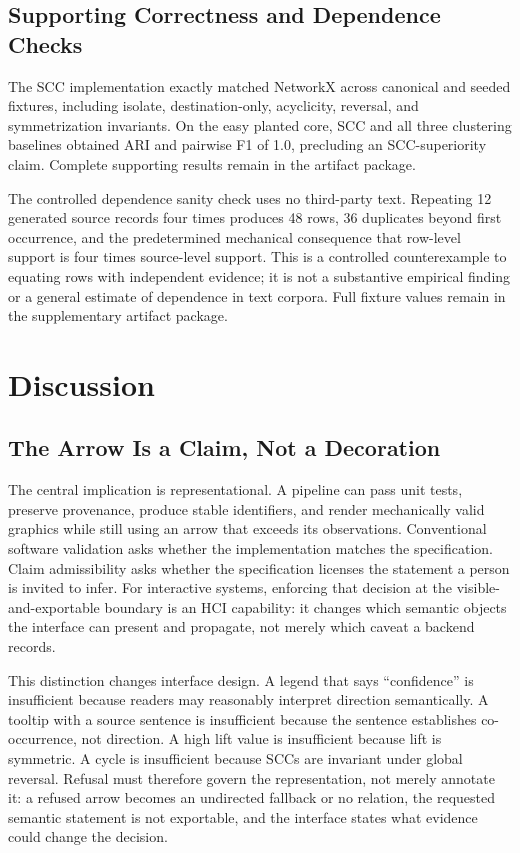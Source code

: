 \documentclass[manuscript,screen,review]{acmart}
\begin{document}
\subsection{Supporting Correctness and Dependence Checks}

The SCC implementation exactly matched NetworkX across canonical and seeded fixtures, including isolate, destination-only, acyclicity, reversal, and symmetrization invariants. On the easy planted core, SCC and all three clustering baselines obtained ARI and pairwise F1 of 1.0, precluding an SCC-superiority claim. Complete supporting results remain in the artifact package.

The controlled dependence sanity check uses no third-party text. Repeating 12 generated source records four times produces 48 rows, 36 duplicates beyond first occurrence, and the predetermined mechanical consequence that row-level support is four times source-level support. This is a controlled counterexample to equating rows with independent evidence; it is not a substantive empirical finding or a general estimate of dependence in text corpora. Full fixture values remain in the supplementary artifact package.

\section{Discussion}

\subsection{The Arrow Is a Claim, Not a Decoration}

The central implication is representational. A pipeline can pass unit tests, preserve provenance, produce stable identifiers, and render mechanically valid graphics while still using an arrow that exceeds its observations. Conventional software validation asks whether the implementation matches the specification. Claim admissibility asks whether the specification licenses the statement a person is invited to infer. For interactive systems, enforcing that decision at the visible-and-exportable boundary is an HCI capability: it changes which semantic objects the interface can present and propagate, not merely which caveat a backend records.

This distinction changes interface design. A legend that says ``confidence'' is insufficient because readers may reasonably interpret direction semantically. A tooltip with a source sentence is insufficient because the sentence establishes co-occurrence, not direction. A high lift value is insufficient because lift is symmetric. A cycle is insufficient because SCCs are invariant under global reversal. Refusal must therefore govern the representation, not merely annotate it: a refused arrow becomes an undirected fallback or no relation, the requested semantic statement is not exportable, and the interface states what evidence could change the decision.
\end{document}
